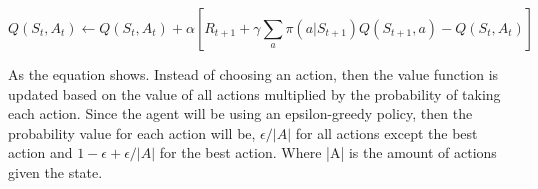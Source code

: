 \begin{equation}
    Q(S_t, A_t) \leftarrow Q(S_t, A_t) + \alpha \left[ R_{t+1} + \gamma \sum_a \pi(a|S_{t+1}) Q(S_{t+1}, a) - Q(S_t, A_t) \right]
\end{equation}

As the equation shows. Instead of choosing an action, then the value function is updated based on the value of all actions multiplied by the probability of taking each action. Since the agent will be using an epsilon-greedy policy, then the probability value for each action will be, $\epsilon / |A|$ for all actions except the best action and $1 - \epsilon + \epsilon / |A|$ for the best action. Where |A| is the amount of actions given the state. 
